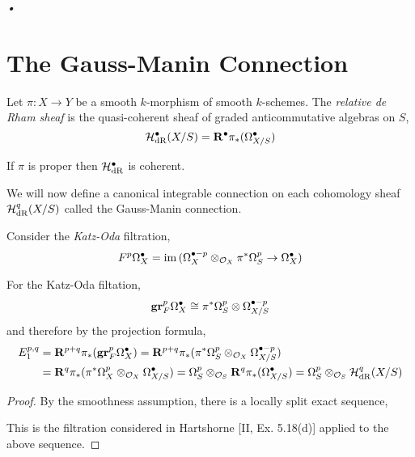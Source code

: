 \textit{•}\documentclass[12pt]{article}
\begin{document}
\section{The Gauss-Manin Connection}

\begin{defn}
Let $\pi : X \to Y$ be a smooth $k$-morphism of smooth $k$-schemes. The \textit{relative de Rham sheaf} is the quasi-coherent sheaf of graded anticommutative algebras on $S$,
\[ \mathcal{H}_{\mathrm{dR}}^\bullet(X/S) = \mathbf{R}^\bullet \pi_* (\Omega^\bullet_{X/S}) \]
\end{defn}

\begin{rmk}
If $\pi$ is proper then $\mathcal{H}_{\mathrm{dR}}^\bullet$ is coherent.
\end{rmk}

We will now define a canonical integrable connection on each cohomology sheaf $\mathcal{H}_{\mathrm{dR}}^q(X/S)$ called the Gauss-Manin connection.

\begin{defn}
Consider the \textit{Katz-Oda} filtration,
\[ F^p \Omega^\bullet_{X} = \operatorname{\mathrm{im}}{(\Omega_X^{\bullet -p} \otimes_{\mathcal{O}_{X}} \pi^* \Omega_S^p \to \Omega_X^\bullet)} \]
\end{defn}

\begin{lemma}
For the Katz-Oda filtation,
\[ \mathbf{gr}^p_F \Omega^\bullet_X \cong \pi^{*}\Omega_S^p \otimes \Omega_{X/S}^{\bullet - p}  \]
and therefore by the projection formula,
\begin{align*}
E_1^{p,q} & = \mathbf{R}^{p+q} \pi_*(\mathbf{gr}^p_F \Omega_X^\bullet) = \mathbf{R}^{p+q} \pi_* (\pi^* \Omega^p_S \otimes_{\mathcal{O}_{X}} \Omega^{\bullet - p}_{X/S}) 
\\
& = \mathbf{R}^q \pi_* (\pi^* \Omega^p_X \otimes_{\mathcal{O}_{X}} \Omega_{X/S}^\bullet) = \Omega^p_{S} \otimes_{\mathcal{O}_{S}} \mathbf{R}^q \pi_* (\Omega^\bullet_{X/S}) = \Omega^p_S \otimes_{\mathcal{O}_{S}} \mathcal{H}_{\mathrm{dR}}^q(X/S) 
\end{align*}
\end{lemma}

\begin{proof}
By the smoothness assumption, there is a locally split exact sequence,
\begin{center}
\end{center}
This is the filtration considered in Hartshorne [II, Ex. 5.18(d)] applied to the above sequence. 
\end{proof}
\end{document}
